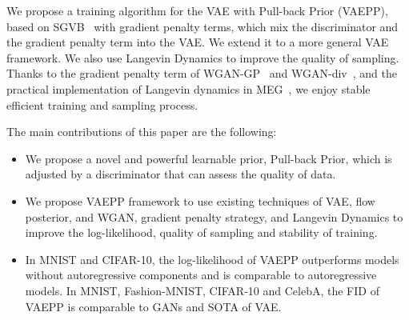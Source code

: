 We propose a training algorithm for the VAE with Pull-back Prior (VAEPP), based on SGVB~\cite{kingma2014auto} with gradient penalty terms, which mix the discriminator and the gradient penalty term into the VAE. We extend it to a more general VAE framework. We also use Langevin Dynamics to improve the quality of sampling. 
Thanks to the gradient penalty term of WGAN-GP~\cite{gulrajani2017improved} and WGAN-div~\cite{wu2018wasserstein}, and the practical implementation of Langevin dynamics in MEG~\cite{kumar2019maximum}, we enjoy stable efficient training and sampling process. 

The main contributions of this paper are the following:
\begin{itemize}
	\item We propose a novel and powerful learnable prior, Pull-back Prior, which is adjusted by a discriminator that can assess the quality of data. 
	\item We propose VAEPP framework to use existing techniques of VAE, \EG flow posterior, and WGAN, \EG gradient penalty strategy, and Langevin Dynamics to improve the log-likelihood, quality of sampling and stability of training. 
	\item In MNIST and CIFAR-10, the log-likelihood of VAEPP outperforms models without autoregressive components and is comparable to autoregressive models. In MNIST, Fashion-MNIST, CIFAR-10 and CelebA,  the FID of VAEPP is comparable to GANs and SOTA of VAE. 
\end{itemize}
